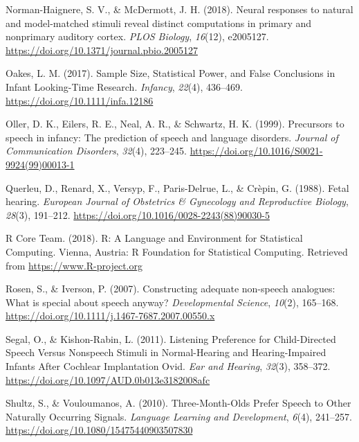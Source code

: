 \documentclass[man]{apa6}
\begin{document}
\leavevmode\hypertarget{ref-norman-haignere_neural_2018}{}%
Norman-Haignere, S. V., \& McDermott, J. H. (2018). Neural responses to natural and model-matched stimuli reveal distinct computations in primary and nonprimary auditory cortex. \emph{PLOS Biology}, \emph{16}(12), e2005127. \url{https://doi.org/10.1371/journal.pbio.2005127}

\leavevmode\hypertarget{ref-oakes_sample_2017}{}%
Oakes, L. M. (2017). Sample Size, Statistical Power, and False Conclusions in Infant Looking-Time Research. \emph{Infancy}, \emph{22}(4), 436--469. \url{https://doi.org/10.1111/infa.12186}

\leavevmode\hypertarget{ref-oller_precursors_1999}{}%
Oller, D. K., Eilers, R. E., Neal, A. R., \& Schwartz, H. K. (1999). Precursors to speech in infancy: The prediction of speech and language disorders. \emph{Journal of Communication Disorders}, \emph{32}(4), 223--245. \url{https://doi.org/10.1016/S0021-9924(99)00013-1}

\leavevmode\hypertarget{ref-querleu_fetal_1988}{}%
Querleu, D., Renard, X., Versyp, F., Paris-Delrue, L., \& Crèpin, G. (1988). Fetal hearing. \emph{European Journal of Obstetrics \& Gynecology and Reproductive Biology}, \emph{28}(3), 191--212. \url{https://doi.org/10.1016/0028-2243(88)90030-5}

\leavevmode\hypertarget{ref-r_core_team_r:_2018}{}%
R Core Team. (2018). R: A Language and Environment for Statistical Computing. Vienna, Austria: R Foundation for Statistical Computing. Retrieved from \url{https://www.R-project.org}

\leavevmode\hypertarget{ref-rosen_constructing_2007}{}%
Rosen, S., \& Iverson, P. (2007). Constructing adequate non-speech analogues: What is special about speech anyway? \emph{Developmental Science}, \emph{10}(2), 165--168. \url{https://doi.org/10.1111/j.1467-7687.2007.00550.x}

\leavevmode\hypertarget{ref-segal_listening_2011}{}%
Segal, O., \& Kishon-Rabin, L. (2011). Listening Preference for Child-Directed Speech Versus Nonspeech Stimuli in Normal-Hearing and Hearing-Impaired Infants After Cochlear Implantation Ovid. \emph{Ear and Hearing}, \emph{32}(3), 358--372. \url{https://doi.org/10.1097/AUD.0b013e3182008afc}

\leavevmode\hypertarget{ref-shultz_three-month-olds_2010}{}%
Shultz, S., \& Vouloumanos, A. (2010). Three-Month-Olds Prefer Speech to Other Naturally Occurring Signals. \emph{Language Learning and Development}, \emph{6}(4), 241--257. \url{https://doi.org/10.1080/15475440903507830}
\end{document}
